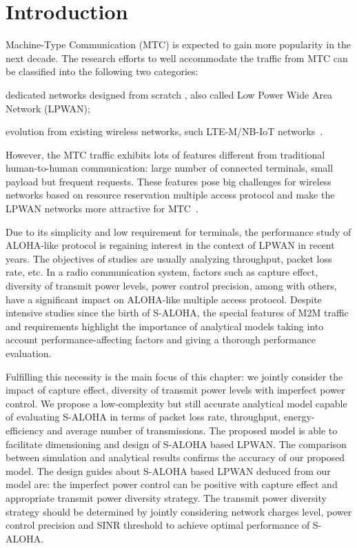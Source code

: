 \section{Introduction}
\label{sec:icc17-introduction}
Machine-Type Communication (MTC) is expected to gain more popularity in the next decade. The research efforts to well accommodate the traffic from MTC can be classified into the following two categories: \begin{inparaenum}[1)]
	\item dedicated networks designed from scratch , also called Low Power Wide Area Network (LPWAN);
	\item evolution from existing wireless networks, such LTE-M/NB-IoT networks~\cite{song2016survey}.
\end{inparaenum}
However, the MTC traffic exhibits lots of features different from traditional human-to-human communication: large number of connected terminals, small payload but frequent requests. These features pose big challenges for wireless networks based on resource reservation multiple access protocol and make the LPWAN networks more attractive for MTC~\cite{goursaud2015dedicated}. 

Due to its simplicity and low requirement for terminals, the performance study of ALOHA-like protocol is regaining interest in the context of LPWAN in recent years. 
The objectives of studies are usually analyzing throughput, packet loss rate, etc. In a radio communication system, factors such as capture effect, diversity of transmit power levels, power control precision, among with others, have a significant impact on ALOHA-like multiple access protocol. Despite intensive studies since the birth of S-ALOHA, the special features of M2M traffic and requirements highlight the importance of analytical models taking into account performance-affecting factors and giving a thorough performance evaluation. 

Fulfilling this necessity is the main focus of this chapter: we jointly consider the impact of capture effect, diversity of transmit power levels with imperfect power control. We propose a low-complexity but still accurate analytical model capable of evaluating S-ALOHA in terms of packet loss rate, throughput, energy-efficiency and average number of transmissions. The proposed model is able to facilitate dimensioning and design of S-ALOHA based LPWAN. The comparison between simulation and analytical results confirms the accuracy of our proposed model. The design guides about S-ALOHA based LPWAN deduced from our model are: the imperfect power control can be positive with capture effect and appropriate transmit power diversity strategy. The transmit power diversity strategy should be determined by jointly considering network charges level, power control precision and SINR threshold to achieve optimal performance of S-ALOHA.




